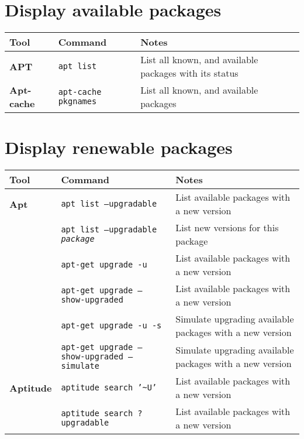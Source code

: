 \documentclass[10pt]{article}
\begin{document}
\section{Display available packages}
\begin{tabular}{ p{3.5cm} p{9cm} p{11cm}}
  \hline
  \rowcolor{Gray}
  \textbf{Tool} & \textbf{Command} & \textbf{Notes} \\
  \hline 
  \textbf{APT} & \texttt{apt list} & List all known, and available packages with its status\\
  \rowcolor{Gray}
  \textbf{Apt-cache} & \texttt{apt-cache pkgnames} & List all known, and available packages\\
  \hline
\end{tabular}

\newpage

\cheatsheet

\section{Display renewable packages}
\begin{tabular}{ p{3.5cm} p{9cm} p{11cm}}
  \hline
  \rowcolor{Gray}
  \textbf{Tool} & \textbf{Command} & \textbf{Notes} \\
  \hline 
  \textbf{Apt} & \texttt{apt list --upgradable} & List available packages with a new version\\
  \rowcolor{Gray}
  & \texttt{apt list --upgradable \textit{package}} & List new versions for this package\\
  & \texttt{apt-get upgrade -u} & List available packages with a new version \\
  \rowcolor{Gray}
  & \texttt{apt-get upgrade --show-upgraded} & List available packages with a new version \\
  & \texttt{apt-get upgrade -u -s} & Simulate upgrading available packages with a new version \\
  \rowcolor{Gray}
  & \texttt{apt-get upgrade --show-upgraded --simulate} & Simulate upgrading available packages with a new version \\
  \textbf{Aptitude} & \texttt{aptitude search '\textasciitilde{U}'} & List available packages with a new version \\
  \rowcolor{Gray}
  & \texttt{aptitude search ?upgradable} & List available packages with a new version \\
  \hline
\end{tabular}
\end{document}
